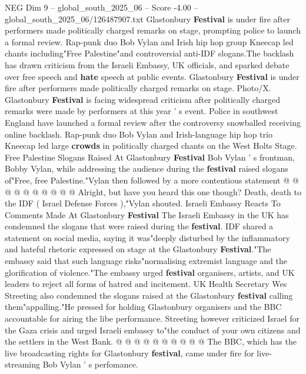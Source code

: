 \begin{textsample}{NEG Dim 9 – global\_south\_2025\_06 – Score -4.00 – global\_south\_2025\_06/126487907.txt}  \label{ex:f9_neg_258}
Glastonbury \textbf{Festival} is under fire after performers made politically charged remarks on stage, prompting police to launch a formal review.
Rap-punk duo Bob Vylan and Irish hip hop group Kneecap led chants including"Free Palestine"and controversial anti-IDF slogans.The backlash has drawn criticism from the Israeli Embassy, UK officials, and sparked debate over free speech and \textbf{hate} speech at public events.
Glastonbury \textbf{Festival} is under fire after performers made politically charged remarks on stage.
Photo/X.
Glastonbury \textbf{Festival} is facing widespread criticism after politically charged remarks were made by performers at this year ' s event.
Police in southwest England have launched a formal review after the controversy snowballed receiving online backlash.
Rap-punk duo Bob Vylan and Irish-language hip hop trio Kneecap led large \textbf{crowds} in politically charged chants on the West Holts Stage.
Free Palestine Slogans Raised At Glastonbury \textbf{Festival} Bob Vylan ' s frontman, Bobby Vylan, while addressing the audience during the \textbf{festival} raised slogans of"Free, free Palestine."Vylan then followed by a more contentious statement @ @ @ @ @ @ @ @ @ @ Alright, but have you heard this one though?
Death, death to the IDF ( Israel Defense Forces ),"Vylan shouted.
Israeli Embassy Reacts To Comments Made At Glastonbury \textbf{Festival} The Israeli Embassy in the UK has condemned the slogans that were raised during the \textbf{festival}.
IDF shared a statement on social media, saying it was"deeply disturbed by the inflammatory and hateful rhetoric expressed on stage at the Glastonbury \textbf{Festival}."The embassy said that such language risks"normalising extremist language and the glorification of violence."The embassy urged \textbf{festival} organisers, artists, and UK leaders to reject all forms of hatred and incitement.
UK Health Secretary Wes Streeting also condemned the slogans raised at the Glastonbury \textbf{festival} calling them"appalling."He pressed for holding Glastonbury organisers and the BBC accountable for airing the libe performance.
Streeting however criticized Israel for the Gaza crisis and urged Israeli embassy to"the conduct of your own citizens and the settlers in the West Bank. @ @ @ @ @ @ @ @ @ @ The BBC, which has the live broadcasting rights for Glastonbury \textbf{festival}, came under fire for live-streaming Bob Vylan ' s perfomance.

\end{textsample}
